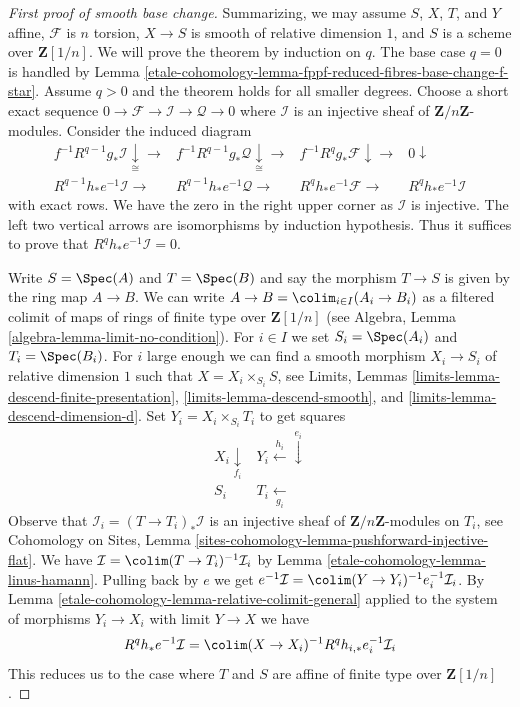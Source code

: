 \begin{proof}[First proof of smooth base change]
\medskip\noindent
Summarizing, we may assume $S$, $X$, $T$, and $Y$ affine,
$\mathcal{F}$ is $n$ torsion, $X \to S$ is smooth of relative dimension $1$,
and $S$ is a scheme over $\mathbf{Z}[1/n]$.
We will prove the theorem by induction on $q$. The base case $q = 0$
is handled by Lemma \ref{etale-cohomology-lemma-fppf-reduced-fibres-base-change-f-star}.
Assume $q > 0$ and the theorem holds for all smaller degrees.
Choose a short exact sequence
$0 \to \mathcal{F} \to \mathcal{I} \to \mathcal{Q} \to 0$
where $\mathcal{I}$ is an injective sheaf of $\mathbf{Z}/n\mathbf{Z}$-modules.
Consider the induced diagram
$$
\begin{array}{cccc}f^{-1}R^{q - 1}g_*\mathcal{I} \underset{\cong}{\downarrow}\longrightarrow & f^{-1}R^{q - 1}g_*\mathcal{Q} \underset{\cong}{\downarrow}\longrightarrow & f^{-1}R^qg_*\mathcal{F} \downarrow\longrightarrow & 0 \downarrow \\ R^{q - 1}h_*e^{-1}\mathcal{I} \longrightarrow & R^{q - 1}h_*e^{-1}\mathcal{Q} \longrightarrow & R^qh_*e^{-1}\mathcal{F} \longrightarrow & R^qh_*e^{-1}\mathcal{I}\end{array}
$$
with exact rows. We have the zero in the right upper corner
as $\mathcal{I}$ is injective. The left two vertical arrows are
isomorphisms by induction hypothesis. Thus it suffices to prove
that $R^qh_*e^{-1}\mathcal{I} = 0$.

\medskip\noindent
Write $S = \Spec(A)$ and $T = \Spec(B)$ and say the morphism
$T \to S$ is given by the ring map $A \to B$. We can write
$A \to B = \colim_{i \in I} (A_i \to B_i)$ as a filtered
colimit of maps of rings of finite type over $\mathbf{Z}[1/n]$
(see Algebra, Lemma \ref{algebra-lemma-limit-no-condition}).
For $i \in I$ we set $S_i = \Spec(A_i)$ and $T_i = \Spec(B_i)$.
For $i$ large enough we can find a smooth morphism $X_i \to S_i$
of relative dimension $1$ such that $X = X_i \times_{S_i} S$, see
Limits, Lemmas \ref{limits-lemma-descend-finite-presentation},
\ref{limits-lemma-descend-smooth}, and
\ref{limits-lemma-descend-dimension-d}. Set $Y_i = X_i \times_{S_i} T_i$
to get squares
$$
\begin{array}{cc}X_i \underset{f_i}{\downarrow} & Y_i \overset{h_i}{\longleftarrow}\overset{e_i}{\downarrow} \\ S_i & T_i \underset{g_i}{\longleftarrow}\end{array}
$$
Observe that $\mathcal{I}_i = (T \to T_i)_*\mathcal{I}$
is an injective sheaf of $\mathbf{Z}/n\mathbf{Z}$-modules on
$T_i$, see Cohomology on Sites, Lemma
\ref{sites-cohomology-lemma-pushforward-injective-flat}.
We have $\mathcal{I} = \colim (T \to T_i)^{-1}\mathcal{I}_i$
by Lemma \ref{etale-cohomology-lemma-linus-hamann}. Pulling back by $e$ we get
$e^{-1}\mathcal{I} = \colim (Y \to Y_i)^{-1}e_i^{-1}\mathcal{I}_i$.
By Lemma \ref{etale-cohomology-lemma-relative-colimit-general} applied to the system
of morphisms $Y_i \to X_i$ with limit $Y \to X$ we have
$$
R^qh_*e^{-1}\mathcal{I} =
\colim (X \to X_i)^{-1} R^qh_{i, *} e_i^{-1}\mathcal{I}_i
$$
This reduces us to the case where $T$ and $S$ are affine of finite
type over $\mathbf{Z}[1/n]$.


\end{proof}
